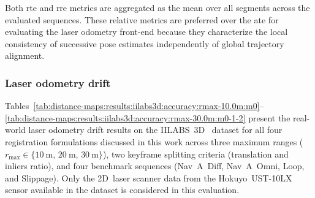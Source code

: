 Both \gls{rte} and \gls{rre} metrics are aggregated as the mean over all
segments across the evaluated sequences.
These relative metrics are preferred over the \gls{ate} for evaluating
the laser odometry front-end because they characterize the local
consistency of successive pose estimates independently of global
trajectory alignment.

\subsubsection{Laser odometry drift}
\label{sec:distance-maps:results:iilabs3d:drift}

Tables~\ref{tab:distance-maps:results:iilabs3d:accuracy:rmax-10.0m:m0}--\ref{tab:distance-maps:results:iilabs3d:accuracy:rmax-30.0m:m0-1-2}
present the real-world laser odometry drift results on the
IILABS~3D~\cite{ribeiro:access:2025} dataset for all four registration
formulations discussed in this work across three maximum ranges
($r_\mathrm{max} \in \{\SI{10}{\metre},\, \SI{20}{\metre},\, \SI{30}{\metre}\}$),
two keyframe splitting criteria (translation and inliers ratio), and
four benchmark sequences (Nav~A~Diff, Nav~A~Omni, Loop, and Slippage).
Only the 2D~laser scanner data from the Hokuyo~UST-10LX sensor available in the
dataset is considered in this evaluation.

